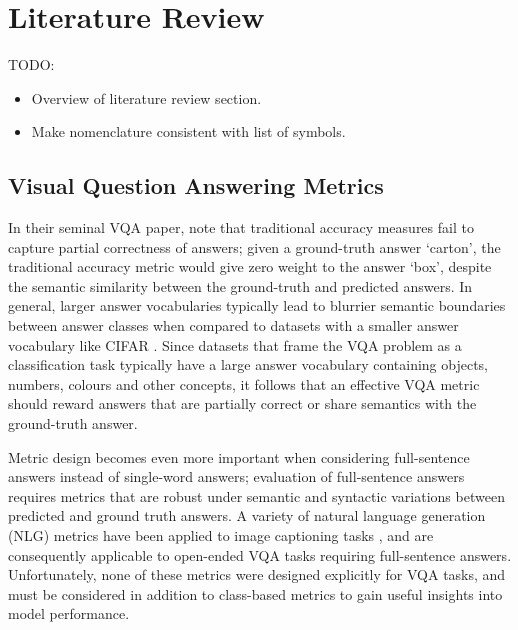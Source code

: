 \chapter{Literature Review}
\label{chapter:literature}

{\color{red} TODO:
\begin{itemize}
    \item Overview of literature review section.
    \item Make nomenclature consistent with list of symbols.
\end{itemize}}


\section{Visual Question Answering Metrics}

In their seminal VQA paper, \citeauthor{malinowski2014multiworld} \cite{malinowski2014multiworld} note that traditional accuracy measures fail to capture partial correctness of answers; given a ground-truth answer `carton', the traditional accuracy metric would give zero weight to the answer `box', despite the semantic similarity between the ground-truth and predicted answers. In general, larger answer vocabularies typically lead to blurrier semantic boundaries between answer classes when compared to datasets with a smaller answer vocabulary like CIFAR \cite{krizhevsky2009learning}. Since datasets that frame the VQA problem as a classification task typically have a large answer vocabulary containing objects, numbers, colours and other concepts, it follows that an effective VQA metric should reward answers that are partially correct or share semantics with the ground-truth answer.

Metric design becomes even more important when considering full-sentence answers instead of single-word answers; evaluation of full-sentence answers requires metrics that are robust under semantic and syntactic variations between predicted and ground truth answers. A variety of natural language generation (NLG) metrics \cite{papineni2002bleu, lin2004rouge, banerjee2005meteor, vedantam2015cider} have been applied to image captioning tasks \cite{chen2015microsoft, vedantam2015cider}, and are consequently applicable to open-ended VQA tasks requiring full-sentence answers. Unfortunately, none of these metrics were designed explicitly for VQA tasks, and must be considered in addition to class-based metrics to gain useful insights into model performance. 


